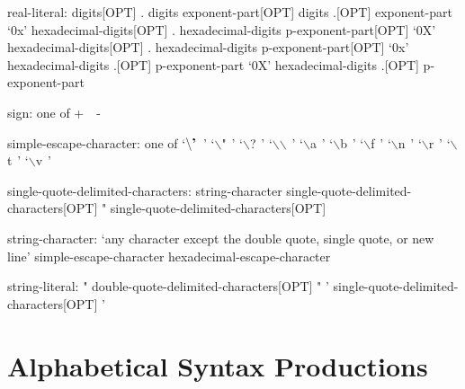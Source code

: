 \begin{syntax}
real-literal:
  digits[OPT] . digits exponent-part[OPT]
  digits .[OPT] exponent-part
  `0x' hexadecimal-digits[OPT] . hexadecimal-digits p-exponent-part[OPT]
  `0X' hexadecimal-digits[OPT] . hexadecimal-digits p-exponent-part[OPT]
  `0x' hexadecimal-digits .[OPT] p-exponent-part
  `0X' hexadecimal-digits .[OPT] p-exponent-part
\end{syntax}

\begin{syntax}
sign: one of
  + $ $ $ $ -
\end{syntax}

\begin{syntax}
simple-escape-character: one of
  `$\backslash\mbox{\bf '}\hspace{5pt}$' `$\backslash$"$\hspace{5pt}$' `$\backslash$?$\hspace{5pt}$' `$\backslash$$\backslash$$\hspace{5pt}$' `$\backslash$a$\hspace{5pt}$' `$\backslash$b$\hspace{5pt}$' `$\backslash$f$\hspace{5pt}$' `$\backslash$n$\hspace{5pt}$' `$\backslash$r$\hspace{5pt}$' `$\backslash$t$\hspace{5pt}$' `$\backslash$v$\hspace{5pt}$'
\end{syntax}

\begin{syntax}
single-quote-delimited-characters:
  string-character single-quote-delimited-characters[OPT]
  " single-quote-delimited-characters[OPT]
\end{syntax}

\begin{syntax}
string-character:
  `any character except the double quote, single quote, or new line'
  simple-escape-character
  hexadecimal-escape-character
\end{syntax}

\begin{syntax}
string-literal:
  " double-quote-delimited-characters[OPT] "
  ' single-quote-delimited-characters[OPT] '
\end{syntax}

\section{Alphabetical Syntax Productions}


